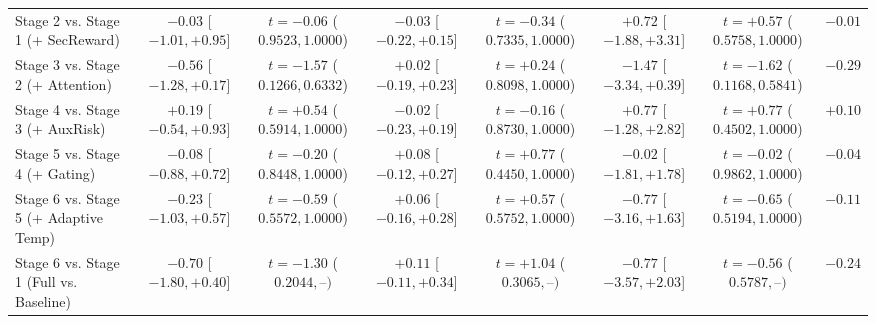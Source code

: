 \begin{table}[!t]
{\begin{tabular}{lccccccc}
\midrule
Stage 2 vs. Stage 1 (+ SecReward) & $-0.03$ [$-1.01, +0.95$] & $t=-0.06$ ($0.9523, 1.0000$) & $-0.03$ [$-0.22, +0.15$] & $t=-0.34$ ($0.7335, 1.0000$) & $+0.72$ [$-1.88, +3.31$] & $t=+0.57$ ($0.5758, 1.0000$) & $-0.01$ \\
Stage 3 vs. Stage 2 (+ Attention) & $-0.56$ [$-1.28, +0.17$] & $t=-1.57$ ($0.1266, 0.6332$) & $+0.02$ [$-0.19, +0.23$] & $t=+0.24$ ($0.8098, 1.0000$) & $-1.47$ [$-3.34, +0.39$] & $t=-1.62$ ($0.1168, 0.5841$) & $-0.29$ \\
Stage 4 vs. Stage 3 (+ AuxRisk) & $+0.19$ [$-0.54, +0.93$] & $t=+0.54$ ($0.5914, 1.0000$) & $-0.02$ [$-0.23, +0.19$] & $t=-0.16$ ($0.8730, 1.0000$) & $+0.77$ [$-1.28, +2.82$] & $t=+0.77$ ($0.4502, 1.0000$) & $+0.10$ \\
Stage 5 vs. Stage 4 (+ Gating) & $-0.08$ [$-0.88, +0.72$] & $t=-0.20$ ($0.8448, 1.0000$) & $+0.08$ [$-0.12, +0.27$] & $t=+0.77$ ($0.4450, 1.0000$) & $-0.02$ [$-1.81, +1.78$] & $t=-0.02$ ($0.9862, 1.0000$) & $-0.04$ \\
Stage 6 vs. Stage 5 (+ Adaptive Temp) & $-0.23$ [$-1.03, +0.57$] & $t=-0.59$ ($0.5572, 1.0000$) & $+0.06$ [$-0.16, +0.28$] & $t=+0.57$ ($0.5752, 1.0000$) & $-0.77$ [$-3.16, +1.63$] & $t=-0.65$ ($0.5194, 1.0000$) & $-0.11$ \\
Stage 6 vs. Stage 1 (Full vs. Baseline) & $-0.70$ [$-1.80, +0.40$] & $t=-1.30$ ($0.2044, \text{--})$ & $+0.11$ [$-0.11, +0.34$] & $t=+1.04$ ($0.3065, \text{--})$ & $-0.77$ [$-3.57, +2.03$] & $t=-0.56$ ($0.5787, \text{--})$ & $-0.24$ \\
\bottomrule
\end{tabular}}
\end{table}
